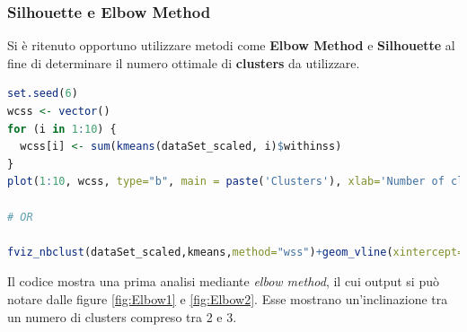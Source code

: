 \documentclass[letterpaper,11pt]{article}
\begin{document}
\subsubsection{Silhouette e Elbow Method}
Si è ritenuto opportuno utilizzare metodi come \textbf{Elbow Method} e \textbf{Silhouette} al fine di determinare il numero ottimale di \textbf{clusters} da utilizzare. 
\begin{lstlisting}[language=R]
set.seed(6)
wcss <- vector()
for (i in 1:10) {
  wcss[i] <- sum(kmeans(dataSet_scaled, i)$withinss)
}
plot(1:10, wcss, type="b", main = paste('Clusters'), xlab='Number of clusters', ylab="WCSS")

# OR

fviz_nbclust(dataSet_scaled,kmeans,method="wss")+geom_vline(xintercept=2,linetype=2)
\end{lstlisting}
Il codice mostra una prima analisi mediante \textit{elbow method}, il cui output si può notare dalle figure \ref{fig:Elbow1} e \ref{fig:Elbow2}. Esse mostrano un'inclinazione tra un numero di clusters compreso tra 2 e 3.
\end{document}
